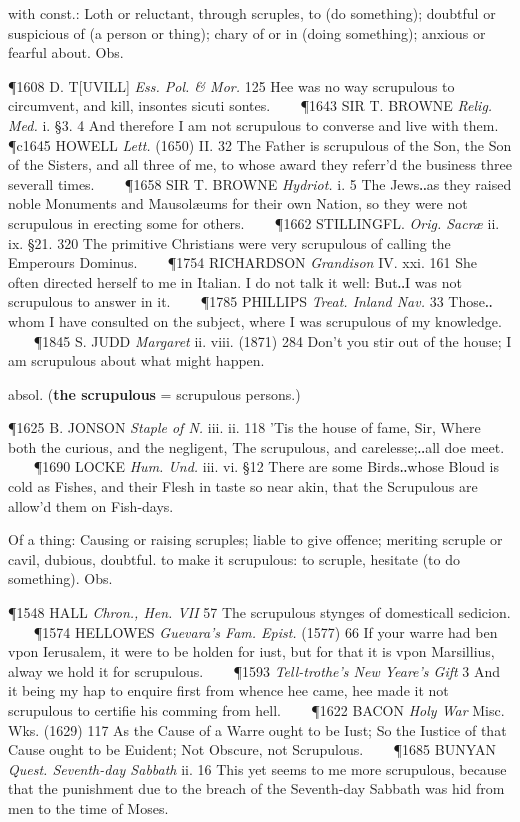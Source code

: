 \begin{description}[wide, labelwidth=!, labelindent=0pt]
\begin{myenumerate}
 with const.: Loth or reluctant, through scruples, to (do something); doubtful or suspicious of (a person or thing); chary of or in (doing something); anxious or fearful about. Obs.

\P 1608 D. T[UVILL]  \textit{Ess. Pol. \& Mor.} 125 Hee was no way scrupulous to circumvent, and kill, insontes sicuti sontes.    
\P 1643 SIR T. BROWNE  \textit{Relig. Med.} i. §3. 4 And therefore I am not scrupulous to converse and live with them.
\P c1645 HOWELL  \textit{Lett.} (1650) II. 32 The Father is scrupulous of the Son, the Son of the Sisters, and all three of me, to whose award they referr'd the business three severall times.    
\P 1658 SIR T. BROWNE  \textit{Hydriot.} i. 5 The Jews‥as they raised noble Monuments and Mausolæums for their own Nation, so they were not scrupulous in erecting some for others.    
\P 1662 STILLINGFL.  \textit{Orig. Sacræ} ii. ix. §21. 320 The primitive Christians were very scrupulous of calling the Emperours Dominus.    
\P 1754 RICHARDSON  \textit{Grandison} IV. xxi. 161 She often directed herself to me in Italian. I do not talk it well: But‥I was not scrupulous to answer in it.    
\P 1785 PHILLIPS  \textit{Treat. Inland Nav.} 33 Those‥whom I have consulted on the subject, where I was scrupulous of my knowledge.    
\P 1845 S. JUDD  \textit{Margaret} ii. viii. (1871) 284 Don't you stir out of the house; I am scrupulous about what might happen.

 absol. (\textbf{the scrupulous} = scrupulous persons.)

\P 1625 B. JONSON  \textit{Staple of N.} iii. ii. 118 'Tis the house of fame, Sir, Where both the curious, and the negligent, The scrupulous, and carelesse;‥all doe meet.    
\P 1690 LOCKE  \textit{Hum. Und.} iii. vi. §12 There are some Birds‥whose Bloud is cold as Fishes, and their Flesh in taste so near akin, that the Scrupulous are allow'd them on Fish-days.

 Of a thing: Causing or raising scruples; liable to give offence; meriting scruple or cavil, dubious, doubtful. to make it scrupulous: to scruple, hesitate (to do something). Obs.

\P 1548 HALL  \textit{Chron., Hen. VII} 57 The scrupulous stynges of domesticall sedicion.    
\P 1574 HELLOWES  \textit{Guevara's Fam. Epist.} (1577) 66 If your warre had ben vpon Ierusalem, it were to be holden for iust, but for that it is vpon Marsillius, alway we hold it for scrupulous.    
\P 1593 \textit{Tell-trothe's  New Yeare's Gift} 3 And it being my hap to enquire first from whence hee came, hee made it not scrupulous to certifie his comming from hell.    
\P 1622 BACON  \textit{Holy War} Misc. Wks. (1629) 117 As the Cause of a Warre ought to be Iust; So the Iustice of that Cause ought to be Euident; Not Obscure, not Scrupulous.    
\P 1685 BUNYAN  \textit{Quest. Seventh-day Sabbath} ii. 16 This yet seems to me more scrupulous, because that the punishment due to the breach of the Seventh-day Sabbath was hid from men to the time of Moses.


\end{myenumerate}
\end{description}
